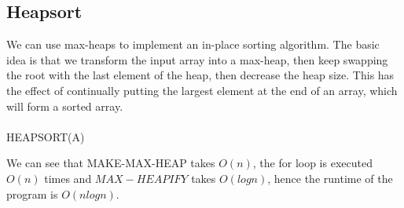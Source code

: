\documentclass{article}
\begin{document}
    \subsection{Heapsort}
        We can use max-heaps to implement an in-place sorting algorithm. The basic idea is that we transform the input array into a max-heap, then keep swapping the root with the last element of the heap, then decrease the heap size. This has the effect of continually putting the largest element at the end of an array, which will form a sorted array. \\ \\
        HEAPSORT(A)
        \begin{algorithmic}[1]
            \EndFor
        \end{algorithmic}
        We can see that MAKE-MAX-HEAP takes $O(n)$, the for loop is executed $O(n)$ times and $MAX-HEAPIFY$ takes $O(log n)$, hence the runtime of the program is $O(n log n)$.
\end{document}
